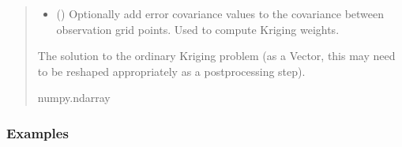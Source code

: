\documentclass[letterpaper,10pt,english]{sphinxmanual}
\begin{document}
\begin{fulllineitems}
\begin{fulllineitems}
\begin{quote}
\begin{description}
\begin{itemize}
\item {}
\sphinxAtStartPar
{} (\sphinxstyleliteralemphasis{\sphinxupquote{ | }}) \textendash{} Optionally add error covariance values to the covariance between
observation grid points. Used to compute Kriging weights.

\end{itemize}

\sphinxAtStartPar
The solution to the ordinary Kriging problem (as a Vector, this may
need to be re\sphinxhyphen{}shaped appropriately as a post\sphinxhyphen{}processing step).

\sphinxAtStartPar
numpy.ndarray

\end{description}\end{quote}
\subsubsection*{Examples}

\begin{sphinxVerbatim}[commandchars=\\\{\}]
  
  
\end{sphinxVerbatim}

\end{fulllineitems}


\end{fulllineitems}

\end{document}

